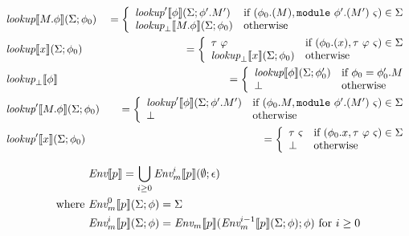 \documentclass[a4paper]{article}
\newcommand{\Env}{\emph{Env}}
\newcommand{\module}{{\tt{module}}}
\newcommand{\If}{\mbox{if}}
\newcommand{\Otherwise}{\mbox{otherwise}}
\newcommand{\Where}{\mbox{where}}
\newcommand{\lookup}{\emph{lookup}}
\begin{document}
\begin{eqnarray*}
&\lookup \llbracket M.\phi \rrbracket (\Sigma; \phi_0) & = \left\{\begin{array}{ll}
\lookup' \llbracket \phi \rrbracket (\Sigma; \phi'.M') & \If\ (\phi_0.(M), \module\ \phi'.(M')\ \varsigma) \in \Sigma \\
\lookup_\bot \llbracket M.\phi \rrbracket (\Sigma; \phi_0) & \Otherwise
\end{array}\right. \\
&\lookup \llbracket x \rrbracket (\Sigma; \phi_0) & = \left\{\begin{array}{ll}
\tau\ \varphi & \If\ (\phi_0.(x), \tau\ \varphi\ \varsigma) \in \Sigma \\
\lookup_\bot \llbracket x \rrbracket (\Sigma; \phi_0) & \Otherwise
\end{array}\right. \\
&\lookup_\bot \llbracket \phi \rrbracket & = \left\{\begin{array}{ll}
\lookup \llbracket \phi \rrbracket (\Sigma; \phi'_0) & \If\ \phi_0 = \phi'_0.M \\
\bot & \Otherwise
\end{array}\right. \\
&\lookup' \llbracket M.\phi \rrbracket (\Sigma; \phi_0) & = \left\{\begin{array}{ll}
\lookup' \llbracket \phi \rrbracket (\Sigma; \phi'.M') & \If\ (\phi_0.M, \module\ \phi'.(M')\ \varsigma) \in \Sigma \\
\bot & \Otherwise
\end{array}\right. \\
&\lookup' \llbracket x \rrbracket (\Sigma; \phi_0) & = \left\{\begin{array}{ll}
\tau\ \varsigma & \If\ (\phi_0.x, \tau\ \varphi\ \varsigma) \in \Sigma \\
\bot & \Otherwise
\end{array}\right. \\
\end{eqnarray*}

\begin{equation*}
\begin{split}
&\Env \llbracket p \rrbracket = \bigcup_{i \ge 0} \Env_m^i \llbracket p \rrbracket (\emptyset; \epsilon) \\
\Where\ & \Env_m^0 \llbracket p \rrbracket (\Sigma; \phi) = \Sigma \\
& \Env_m^i \llbracket p \rrbracket (\Sigma; \phi) = \Env_m \llbracket p \rrbracket (\Env_m^{i-1} \llbracket p \rrbracket (\Sigma; \phi); \phi)\ \mbox{for}\ i \ge 0 \\
\end{split}
\end{equation*}
\end{document}
